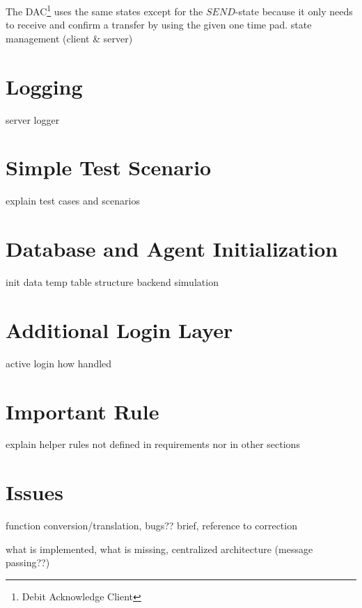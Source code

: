 The DAC\footnote{Debit Acknowledge Client} uses the same states except for the $SEND$-state because it only needs to receive and confirm a transfer by using the given one time pad.
state management (client \& server)

\section{Logging}
\label{sec:impl-log}

server logger


\section{Simple Test Scenario}
\label{sec:impl-test}

explain test cases and scenarios

\section{Database and Agent Initialization}
\label{sec:impl-db-init}

init data
temp table structure
backend simulation

\section{Additional Login Layer}
\label{sec:impl-login-layer}

active login how handled

\section{Important Rule}
\label{sec:impl-rules}

explain helper rules not defined in requirements nor in other sections

\section{Issues}
\label{sec:impl-issues}

function conversion/translation, bugs?? brief, reference to correction

what is implemented, what is missing, centralized architecture (message passing??)